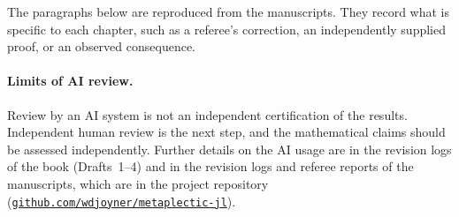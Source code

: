 \documentclass[12pt,letterpaper,oneside]{book}
\theoremstyle{plain}
\theoremstyle{definition}
\begin{document}
The paragraphs below are reproduced from the manuscripts. They record
what is specific to each chapter, such as a referee's correction, an
independently supplied proof, or an observed consequence.



\paragraph{Limits of AI review.} Review by an AI system is not an
independent certification of the results. Independent human review
is the next step, and the mathematical claims should
be assessed independently. Further details on the AI usage are in the
revision logs of the book (Drafts~1--4) and in the revision logs and referee reports
of the manuscripts, which are in the project repository
(\href{https://github.com/wdjoyner/metaplectic-jl}{\nolinkurl{github.com/wdjoyner/metaplectic-jl}}).



\cleardoublepage
{}
\begingroup

\printindex
\endgroup
\end{document}

